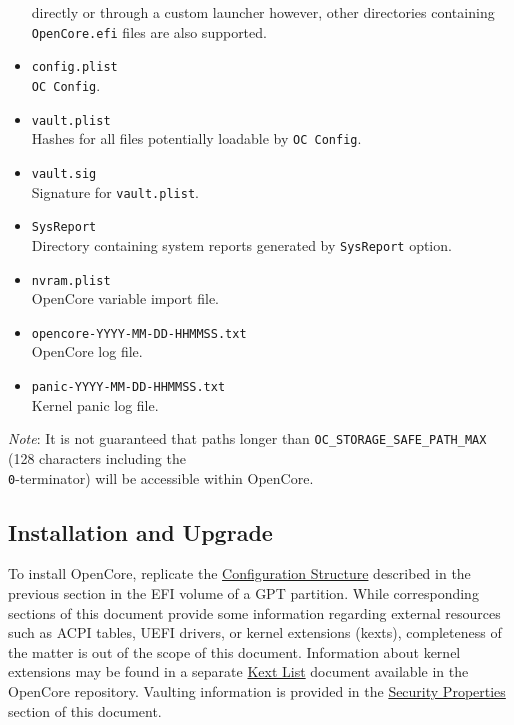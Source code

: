 \documentclass[]{article}
\begin{document}
\begin{itemize}
  directly or through a custom launcher however, other directories containing
  \texttt{OpenCore.efi} files are also supported.
\item
  \texttt{config.plist} \\
  \texttt{OC Config}.
\item
  \texttt{vault.plist} \\
  Hashes for all files potentially loadable by \texttt{OC Config}.
\item
  \texttt{vault.sig} \\
  Signature for \texttt{vault.plist}.
\item
  \texttt{SysReport} \\
  Directory containing system reports generated by \texttt{SysReport} option.
\item
  \texttt{nvram.plist} \\
  OpenCore variable import file.
\item
  \texttt{opencore-YYYY-MM-DD-HHMMSS.txt} \\
  OpenCore log file.
\item
  \texttt{panic-YYYY-MM-DD-HHMMSS.txt} \\
  Kernel panic log file.
\end{itemize}

\emph{Note}: It is not guaranteed that paths longer than
\texttt{OC\_STORAGE\_SAFE\_PATH\_MAX} (128 characters including
the \texttt{\\0}-terminator) will be accessible within OpenCore.

\subsection{Installation and Upgrade}\label{configuration-install}

To install OpenCore, replicate the
\hyperref[configuration-structure]{Configuration Structure} described
in the previous section in the EFI volume of a GPT partition. While
corresponding sections of this document provide some information
regarding external resources such as ACPI tables, UEFI drivers,
or kernel extensions (kexts), completeness of the matter is out of
the scope of this document. Information about kernel extensions may
be found in a separate
\href{https://github.com/acidanthera/OpenCorePkg/blob/master/Docs/Kexts.md}{Kext List}
document available in the OpenCore repository. Vaulting information is provided in
the \hyperref[miscsecurityprops]{Security Properties} section of this document.
\end{document}
